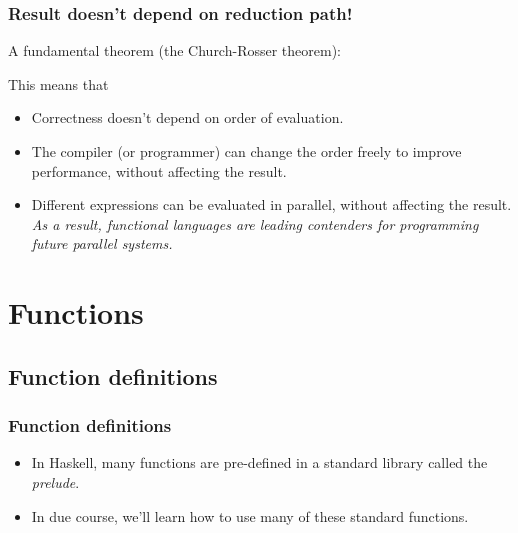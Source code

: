 \documentclass{beamer}
\begin{document}
\begin{frame}
\frametitle{Result doesn't depend on reduction path!}

A fundamental theorem (the Church-Rosser theorem):

\begin{center}
\end{center}

This means that
\begin{itemize}
\item Correctness doesn't depend on order of evaluation.
\item The compiler (or programmer) can change the order freely to
  improve performance, without affecting the result.
\item Different expressions can be evaluated in parallel, without
  affecting the result.  {\redtext \emph{As a result, functional
      languages are leading contenders for programming future
      parallel systems.}}
\end{itemize}

\end{frame}

\section{Functions}

\subsection{Function definitions}

\begin{frame}[fragile]
\frametitle{Function definitions}

\begin{itemize}
\item In Haskell, many functions are pre-defined in a standard
  library called the  \emph{prelude}.%
\item In due course, we'll learn how to use many of these standard
  functions.
\end{itemize}

\end{frame}
\end{document}
